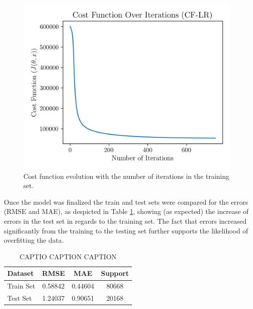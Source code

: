 \documentclass[conference]{IEEEtran}
\begin{document}


\begin{figure}[H]
    \centering
    \includegraphics[width=1\linewidth]{assets/model01_cost_function.png}
    \caption{Cost function evolution with the number of iterations in the training set.}
    \label{fig:model01_cost_function}
\end{figure}

Once the model was finalized the train and test sets were compared for the errors (RMSE and MAE), as despicted in Table \ref{tab:model01_results}, showing (as expected) the increase of errors in the test set in regards to the training set. The fact that errors increased significantly from the training to the testing set further supports the likelihood of overfitting the data.

\begin{table}[H]
\centering
\caption{CAPTIO CAPTION CAPTION}
\label{tab:model01_results}
\begin{tabular}{lccc}
\toprule
\textbf{Dataset} & \textbf{RMSE} & \textbf{MAE} & \textbf{Support} \\
\midrule
Train Set & 0.58842 & 0.44604 & 80668 \\
Test Set & 1.24037 & 0.90651 & 20168 \\
\bottomrule
\end{tabular}
\end{table}
\end{document}
